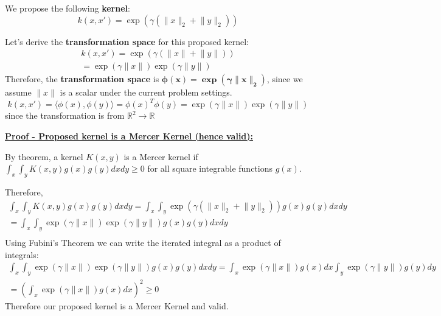 \documentclass[11pt]{article}
\begin{document}
We propose the following {\color{red}\textbf{kernel}}:%
\begin{equation}
    k(x, x') = \exp\left( \gamma \left( \lVert x \rVert_{2} + \lVert y \rVert_{2} \right) \right)
\end{equation}
 
Let's derive the \textbf{transformation space} for this proposed kernel:%
\begin{gather*}
    k(x, x') = \exp\left( \gamma \left( \lVert x \rVert + \lVert y \rVert \right) \right) \\
    = \exp\left( \gamma \lVert x \rVert \right) \exp\left( \gamma \lVert y \rVert \right) 
\end{gather*} 
Therefore, the {\color{red}\textbf{transformation space}} is $\boldsymbol{\phi(x) = \exp\left( \gamma \lVert x \rVert_{2} \right)}$, since we assume $\lVert x \rVert$ is a scalar under the current problem settings.%
\begin{equation*}
    k(x, x') = \langle \phi(x), \phi(y) \rangle = \phi(x)^{T}\phi(y) = \exp\left( \gamma \lVert x \rVert \right) \exp\left( \gamma \lVert y \rVert \right)
\end{equation*}
since the transformation is from $\mathbb{R}^{2} \longrightarrow \mathbb{R}$


\underline{\textbf{Proof - Proposed kernel is a Mercer Kernel (hence valid): }}

By theorem, a kernel $K(x, y)$ is a Mercer kernel if $\int_{x} \int_{y} K(x, y) g(x) g(y) dx dy \geq 0$ for all square integrable functions $g(x)$.

Therefore,%
\begin{gather*}
    \int_{x} \int_{y} K(x, y) g(x) g(y) dx dy = \int_{x} \int_{y} \exp\left( \gamma \left( \lVert x \rVert_{2} + \lVert y \rVert_{2} \right) \right) g(x) g(y) dx dy \\
    = \int_{x} \int_{y} \exp\left( \gamma \lVert x \rVert \right) \exp\left( \gamma \lVert y \rVert \right)  g(x) g(y) dx dy \\
\end{gather*}%
Using Fubini's Theorem we can write the iterated integral as a product of integrals:%
\begin{gather*}
    \int_{x} \int_{y} \exp\left( \gamma \lVert x \rVert \right) \exp\left( \gamma \lVert y \rVert \right)  g(x) g(y) dx dy = \int_{x} \exp\left( \gamma \lVert x \rVert \right) g(x) dx \int_{y} \exp\left( \gamma \lVert y \rVert \right) g(y) dy \\
    = \left( \int_{x} \exp\left( \gamma \lVert x \rVert \right) g(x) dx \right)^{2} \geq 0
\end{gather*}
Therefore our proposed kernel is a Mercer Kernel and valid.
\end{document}
